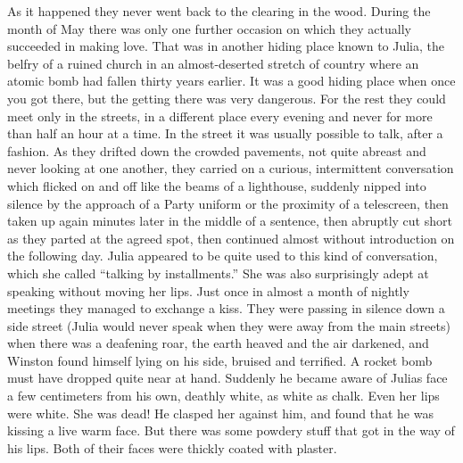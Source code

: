 As it happened they never went back to the clearing in the wood. During
the month of May there was only one further occasion on which they
actually succeeded in making love. That was in another hiding place
known to Julia, the belfry of a ruined church in an almost-deserted
stretch of country where an atomic bomb had fallen thirty years earlier.
It was a good hiding place when once you got there, but the getting
there was very dangerous. For the rest they could meet only in the
streets, in a different place every evening and never for more than half
an hour at a time. In the street it was usually possible to talk, after
a fashion. As they drifted down the crowded pavements, not quite abreast
and never looking at one another, they carried on a curious,
intermittent conversation which flicked on and off like the beams of a
lighthouse, suddenly nipped into silence by the approach of a Party
uniform or the proximity of a telescreen, then taken up again minutes
later in the middle of a sentence, then abruptly cut short as they
parted at the agreed spot, then continued almost without introduction on
the following day. Julia appeared to be quite used to this kind of
conversation, which she called ``talking by installments.'' She was also
surprisingly adept at speaking without moving her lips. Just once in
almost a month of nightly meetings they managed to exchange a kiss. They
were passing in silence down a side street (Julia would never speak when
they were away from the main streets) when there was a deafening roar,
the earth heaved and the air darkened, and Winston found himself lying
on his side, bruised and terrified. A rocket bomb must have dropped
quite near at hand. Suddenly he became aware of Julia\textquotesingle s
face a few centimeters from his own, deathly white, as white as chalk.
Even her lips were white. She was dead! He clasped her against him, and
found that he was kissing a live warm face. But there was some powdery
stuff that got in the way of his lips. Both of their faces were thickly
coated with plaster.

